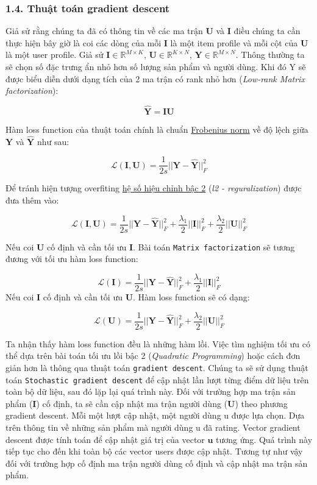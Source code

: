 \documentclass[11pt]{article}
\begin{document}
\subsubsection{1.4. Thuật toán gradient
descent}\label{thuux1eadt-touxe1n-gradient-descent}

Giả sử rằng chúng ta đã có thông tin về các ma trận \(\mathbf{U}\) và
\(\mathbf{I}\) điều chúng ta cần thực hiện bây giờ là coi các dòng của
mỗi \(\mathbf{I}\) là một item profile và mỗi cột của \(\mathbf{U}\) là
một user profile. Giả sử \(\mathbf{I} \in \mathbb{R}^{M \times K}\),
\(\mathbf{U} \in \mathbb{R}^{K \times N}\),
\(\mathbf{Y} \in \mathbb{R}^{M \times N}\). Thông thường ta sẽ chọn số
đặc trưng ẩn nhỏ hơn số lượng sản phẩm và người dùng. Khi đó Y sẽ được
biểu diễn dưới dạng tích của 2 ma trận có rank nhỏ hơn (\emph{Low-rank
Matrix factorization}):

\[\hat{\mathbf{Y}} = \mathbf{I}\mathbf{U}\]

Hàm loss function của thuật toán chính là chuẩn
\href{http://mathworld.wolfram.com/FrobeniusNorm.html}{Frobenius norm}
về độ lệch giữa \(\mathbf{Y}\) và \(\mathbf{\hat{Y}}\) như sau:

\[\mathcal{L(\mathbf{I},\mathbf{U})} = \frac{1}{2s}||\mathbf{Y}-\mathbf{\hat{Y}}||_{F}^2\]

Để tránh hiện tượng overfiting
\href{https://towardsdatascience.com/l1-and-l2-regularization-methods-ce25e7fc831c}{hệ
số hiệu chỉnh bậc 2} (\emph{l2 - reguralization}) được đưa thêm vào:

\[\mathcal{L(\mathbf{I},\mathbf{U})} = \frac{1}{2s}||\mathbf{Y}-\mathbf{\hat{Y}}||_{F}^2 + \frac{\lambda_1}{2}||\mathbf{I}||_{F}^2 + \frac{\lambda_2}{2}||\mathbf{U}||_{F}^2 \tag{1.4.1}\]

Nếu coi \(\mathbf{U}\) cố định và cần tối ưu \(\mathbf{I}\). Bài toán
\texttt{Matrix\ factorization} sẽ tương đương với tối ưu hàm loss
function:

\[\mathcal{L(\mathbf{I})} = \frac{1}{2s}||\mathbf{Y}-\mathbf{\hat{Y}}||_{F}^2 + \frac{\lambda_1}{2}||\mathbf{I}||_{F}^2\]
Nếu coi \(\mathbf{I}\) cố định và cần tối ưu \(\mathbf{U}\). Hàm loss
function sẽ có dạng:

\[\mathcal{L(\mathbf{U})} = \frac{1}{2s}||\mathbf{Y}-\mathbf{\hat{Y}}||_{F}^2 + \frac{\lambda_2}{2}||\mathbf{U}||_{F}^2\]

Ta nhận thấy hàm loss function đều là những hàm lồi. Việc tìm nghiệm tối
ưu có thể dựa trên bài toán tối ưu lồi bậc 2 (\emph{Quadratic
Programming}) hoặc cách đơn giản hơn là thông qua thuật toán
\texttt{gradient\ descent}. Chúng ta sẽ sử dụng thuật toán
\texttt{Stochastic\ gradient\ descent} để cập nhật lần lượt từng điểm dữ
liệu trên toàn bộ dữ liệu, sau đó lặp lại quá trình này. Đối với trường
hợp ma trận sản phẩm (\(\mathbf{I}\)) cố định, ta sẽ cần cập nhật ma
trận người dùng (\(\mathbf{U}\)) theo phương gradient descent. Mỗi một
lượt cập nhật, một người dùng u được lựa chọn. Dựa trên thông tin về
những sản phẩm mà người dùng u đã rating. Vector gradient descent được
tính toán để cập nhật giá trị của vector \(\mathbf{u}\) tương ứng. Quá
trình này tiếp tục cho đến khi toàn bộ các vector users được cập nhật.
Tương tự như vậy đối với trường hợp cố định ma trận người dùng cố định
và cập nhật ma trận sản phẩm.
\end{document}
